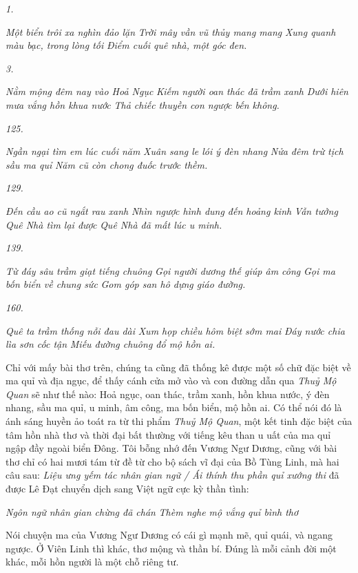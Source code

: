\documentclass[../main.tex]{subfiles}
\begin{document}
\begin{multicols}{2}
\textit{1.} 

\textit{Một biển trôi xa nghìn đảo lặn} 
\textit{Trời mây vần vũ thủy mang mang} 
\textit{Xung quanh màu bạc, trong lòng tối} 
\textit{Điểm cuối quê nhà, một góc đen.} 

\textit{3.} 

\textit{Nằm mộng đêm nay vào Hoả Ngục} 
\textit{Kiếm người oan thác đã trầm xanh} 
\textit{Dưới hiên mưa vắng hồn khua nước} 
\textit{Thả chiếc thuyền con ngược bến không.} 

\textit{125.} 

\textit{Ngần ngại tìm em lúc cuối năm} 
\textit{Xuân sang le lói ý đèn nhang} 
\textit{Nửa đêm trừ tịch sầu ma quỉ} 
\textit{Năm cũ còn chong đuốc trước thềm.} 

\textit{129.} 

\textit{Đến cầu ao cũ ngắt rau xanh} 
\textit{Nhìn ngược hình dung đến hoảng kinh} 
\textit{Vẫn tưởng Quê Nhà tìm lại được} 
\textit{Quê Nhà đã mất lúc u minh.} 

\textit{139.} 

\textit{Từ đáy sâu trầm giạt tiếng chuông} 
\textit{Gọi người dương thế giúp âm công} 
\textit{Gọi ma bốn biển về chung sức} 
\textit{Gom góp san hô dựng giáo đường.} 

\textit{160.} 

\textit{Quê ta trầm thống nỗi đau dài} 
\textit{Xum họp chiều hôm biệt sớm mai} 
\textit{Đáy nước chia lìa sơn cốc tận} 
\textit{Miếu đường chuông đổ mộ hồn ai.} 

Chỉ với mấy bài thơ trên, chúng ta cũng đã thống kê được một số chữ đặc biệt về ma quỉ và địa ngục, để thấy cánh cửa mở vào và con đường dẫn qua \textit{Thuỷ Mộ Quan} sẽ như thế nào: Hoả ngục, oan thác, trầm xanh, hồn khua nước, ý đèn nhang, sầu ma quỉ, u minh, âm công, ma bốn biển, mộ hồn ai. Có thể nói đó là ánh sáng huyền ảo toát ra từ thi phẩm \textit{Thuỷ Mộ Quan}, một kết tinh đặc biệt của tâm hồn nhà thơ và thời đại bất thường với tiếng kêu than u uất của ma quỉ ngập đầy ngoài biển Đông. Tôi bỗng nhớ đến Vương Ngư Dương, cũng với bài thơ chỉ có hai mươi tám từ đề từ cho bộ sách vĩ đại của Bồ Tùng Linh, mà hai câu sau: \textit{Liệu ưng yếm tác nhân gian ngữ / Ái thính thu phần quỉ xướng thi }đã được Lê Đạt chuyển dịch sang Việt ngữ cực kỳ thần tình: 

\textit{Ngôn ngữ nhân gian chừng đã chán} 
\textit{Thèm nghe mộ vắng quỉ bình thơ} 

Nói chuyện ma của Vương Ngư Dương có cái gì mạnh mẽ, quỉ quái, và ngang ngược. Ở Viên Linh thì khác, thơ mộng và thần bí. Đúng là mỗi cảnh đời một khác, mỗi hồn người là một chỗ riêng tư. 


\end{multicols}
\end{document}

